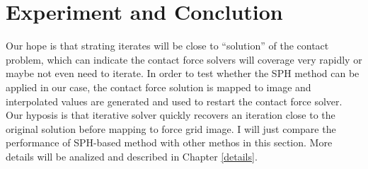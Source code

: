 \section{Experiment and Conclution}
    \label{sec:sph-exp}
    Our hope is that strating iterates will be close to ``solution'' of the contact problem, which can indicate the contact force solvers will coverage very rapidly or maybe not even need to iterate. In order to test whether the SPH method can be applied in our case, the contact force solution is mapped to image and interpolated values are generated and used to restart the contact force solver. Our hyposis is that iterative solver quickly recovers an iteration close to the original solution before mapping to force grid image. I will just compare the performance of SPH-based method with other methos in this section. More details will be analized and described in Chapter \ref{details}.

